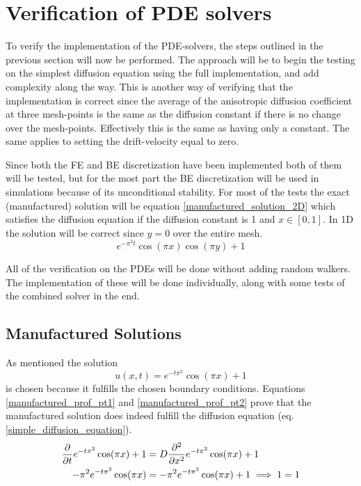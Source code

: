 \section{Verification of PDE solvers}
To verify the implementation of the PDE-solvers, the steps outlined in the previous section will now be performed. 
The approach will be to begin the testing on the simplest diffusion equation using the full implementation, and add complexity along the way. 
This is another way of verifying that the implementation is correct since the average of the anisotropic diffusion coefficient at three mesh-points is the same as the diffusion constant if there is no change over the mesh-points. Effectively this is the same as having only a constant. 
The same applies to setting the drift-velocity equal to zero. 

Since both the FE and BE discretization have been implemented both of them will be tested, but for the most part the BE discretization will be used in simulations because of its unconditional stability.
For most of the tests the exact (manufactured) solution will be equation \eqref{manufactured_solution_2D} which satisfies the diffusion equation if the diffusion constant is 1 and $x\in[0,1]$. 
In 1D the solution will be correct since $y=0$ over the entire mesh. 
\begin{equation}\label{manufactured_solution_2D}
 e^{-\pi^2t}\cos(\pi x)\cos(\pi y) +1
\end{equation}


All of the verification on the PDEs will be done without adding random walkers. The implementation of these will be done individually, along with some tests of the combined solver in the end.

\subsection{Manufactured Solutions}

As mentioned the solution
\begin{equation}\label{manifactured_solution_1D}
 u(x,t) = e^{-t\pi^2}\cos(\pi x) +1
\end{equation}
is chosen because it fulfills the chosen boundary conditions.
Equations \eqref{manufactured_prof_pt1} and \eqref{manufactured_prof_pt2} prove that the manufactured solution does indeed fulfill the diffusion equation (eq. \ref{simple_diffusion_equation}).
\begin{align}
 \frac{\partial }{\partial t}e^{-t\pi^2}\cos(\pi x) +1 &= D\frac{\partial^2}{\partial x^2}e^{-t\pi^2}\cos(\pi x) +1\label{manufactured_prof_pt1}\\
 -\pi^2e^{-t\pi^2}\cos(\pi x) &= -\pi^2e^{-t\pi^2}\cos(\pi x) +1 \implies 1 = 1\label{manufactured_prof_pt2}
\end{align}

